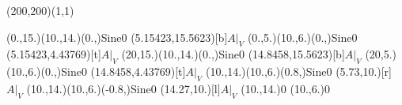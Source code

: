 \unitlength=1bp%

\begin{feynartspicture}(200,200)(1,1)

\FADiagram{}
\FAProp(0.,15.)(10.,14.)(0.,){Sine}{0}
\FALabel(5.15423,15.5623)[b]{$A|_V$}
\FAProp(0.,5.)(10.,6.)(0.,){Sine}{0}
\FALabel(5.15423,4.43769)[t]{$A|_V$}
\FAProp(20,15.)(10.,14.)(0.,){Sine}{0}
\FALabel(14.8458,15.5623)[b]{$A|_V$}
\FAProp(20,5.)(10.,6.)(0.,){Sine}{0}
\FALabel(14.8458,4.43769)[t]{$A|_V$}
\FAProp(10.,14.)(10.,6.)(0.8,){Sine}{0}
\FALabel(5.73,10.)[r]{$A|_V$}
\FAProp(10.,14.)(10.,6.)(-0.8,){Sine}{0}
\FALabel(14.27,10.)[l]{$A|_V$}
\FAVert(10.,14.){0}
\FAVert(10.,6.){0}
\end{feynartspicture}

